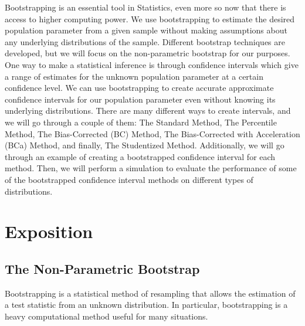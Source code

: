\documentclass[12pt]{article}
\begin{document}
Bootstrapping is an essential tool in Statistics, even more so now that
there is access to higher computing power. We use bootstrapping to
estimate the desired population parameter from a given sample without
making assumptions about any underlying distributions of the sample.
Different bootstrap techniques are developed, but we will focus on the
non-parametric bootstrap for our purposes. One way to make a statistical
inference is through confidence intervals which give a range of
estimates for the unknown population parameter at a certain confidence
level. We can use bootstrapping to create accurate approximate
confidence intervals for our population parameter even without knowing
its underlying distributions. There are many different ways to create
intervals, and we will go through a couple of them: The Standard Method,
The Percentile Method, The Bias-Corrected (BC) Method, The
Bias-Corrected with Acceleration (BCa) Method, and finally, The
Studentized Method. Additionally, we will go through an example of
creating a bootstrapped confidence interval for each method. Then, we
will perform a simulation to evaluate the performance of some of the
bootstrapped confidence interval methods on different types of
distributions.

\hypertarget{exposition}{%
\section{Exposition}\label{exposition}}

\hypertarget{the-non-parametric-bootstrap}{%
\subsection{The Non-Parametric
Bootstrap}\label{the-non-parametric-bootstrap}}

Bootstrapping is a statistical method of resampling that allows the
estimation of a test statistic from an unknown distribution. In
particular, bootstrapping is a heavy computational method useful for
many situations.
\end{document}
